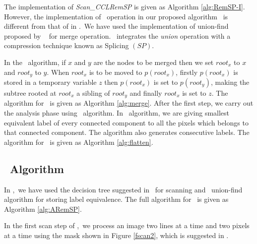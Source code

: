 
% 
The implementation of {\em Scan\_CCLRemSP} is given as Algorithm
\ref{alg:RemSP-I}. However, the implementation of \merge\ operation in our
proposed algorithm \remsp\ is different from that of in \lrpc.\
We have used the implementation of union-find proposed by \rems\ 
\cite{Patwary2010_RemSP, Dijkstra1976_RemSP} for merge operation. \rems\ integrates the {\em union}
operation with a compression technique known as Splicing $(SP)$. 

In the \merge\ algorithm, if $x$ and $y$ are the nodes to be merged then we set $root_x$ to $x$ and $root_y$ to $y$. 
When $root_x$ is to be moved to $p(root_x)$, firstly $p(root_x)$ is
stored in a temporary variable $z$ then $p(root_x)$ is set to $p(root_y)$,
making the subtree rooted at $root_x$ a sibling of $root_y$ and finally
$root_x$ is set to $z$. The algorithm for \merge\ is given as Algorithm
\ref{alg:merge}. After the first step, we carry out the analysis phase using \flatten\ algorithm. In \flatten\ algorithm, we are
giving smallest equivalent label of every connected component to all the pixels
which belongs to that connected component. The algorithm also
generates consecutive labels. The algorithm for \flatten\ is given as Algorithm
\ref{alg:flatten}. 



%
\subsection{\aremsp\ Algorithm}

In \aremsp,\ we have used the decision tree suggested in \arun\ 
for scanning and \rems\ union-find algorithm for storing label equivalence. The
full algorithm for \aremsp\ is given as Algorithm \ref{alg:ARemSP}.

In the first scan step of \aremsp,\ we process an image two lines at a time and
two pixels at a time using the mask shown in Figure \ref{fscan2}, which is
suggested in \cite{He2012_ARun}.


% 



